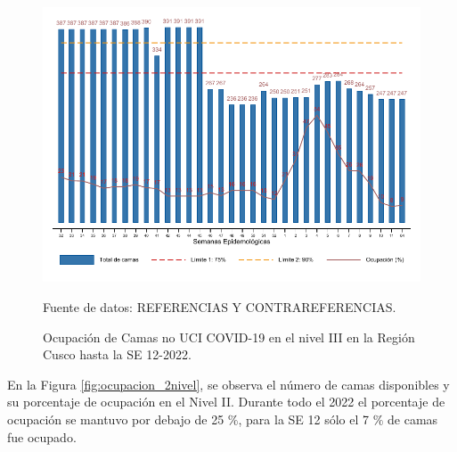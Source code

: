 \documentclass[12pt,a4paper,openany]{book}
\begin{document}
\begin{figure}[htpb]
	\caption{Ocupación de Camas no UCI COVID-19 en el nivel III en la Región Cusco hasta la SE 12-2022.}\label{fig:ocupacion_3_nivel}
	\begin{center}
		\includegraphics[width=0.95\linewidth]{../figuras/nivel_3.pdf}
	\end{center}
	{\footnotesize {Fuente de datos: REFERENCIAS Y CONTRAREFERENCIAS.}}
\end{figure}

\clearpage

En la Figura \ref{fig:ocupacion_2nivel}, se observa el número de camas disponibles y su porcentaje de ocupación en el Nivel II. Durante todo el 2022 el porcentaje de ocupación se mantuvo por debajo de 25 $\%$, para la SE 12 sólo el 7 $\%$ de camas fue ocupado. 
\end{document}
